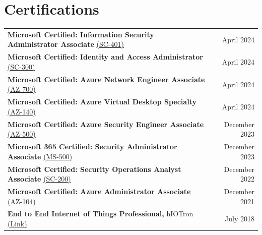 \documentclass[11pt, letterpaper]{article}
\begin{document}
\section{Certifications}
\begin{itemize}[leftmargin=0.15in, label={}]
    \small{\item{
    \begin{tabular*}{0.97\textwidth}{l@{\extracolsep{\fill}}r}
      \textbf{\color{darktext}Microsoft Certified: Information Security Administrator Associate} \href{https://learn.microsoft.com/api/credentials/share/en-in/ChinmayDhokMAQSoftware-5822/175A9EF2AB5B5B56?sharingId=BC2982D57159EF1A}{\color{graytext}(SC-401)} & \color{lightgray}April 2024 \\
      \textbf{\color{darktext}Microsoft Certified: Identity and Access Administrator} \href{https://learn.microsoft.com/en-us/users/chinmaydhokmaqsoftware-5822/credentials/82be0c3d23d052b8}{\color{graytext}(SC-300)} & \color{lightgray}April 2024 \\
      \textbf{\color{darktext}Microsoft Certified: Azure Network Engineer Associate} \href{https://learn.microsoft.com/en-us/users/ChinmayDhokMAQSoftware-5822/credentials/4244163FEBBEDDAF}{\color{graytext}(AZ-700)} & \color{lightgray}April 2024 \\
      \textbf{\color{darktext}Microsoft Certified: Azure Virtual Desktop Specialty} \href{https://learn.microsoft.com/en-us/users/chinmaydhokmaqsoftware-5822/credentials/ccf1857230b93a53}{\color{graytext}(AZ-140)} & \color{lightgray}April 2024 \\
      \textbf{\color{darktext}Microsoft Certified: Azure Security Engineer Associate} \href{https://learn.microsoft.com/en-us/users/ChinmayDhokMAQSoftware-5822/credentials/AB3913F87040CE9}{\color{graytext}(AZ-500)} & \color{lightgray}December 2023 \\
      \textbf{\color{darktext}Microsoft 365 Certified: Security Administrator Associate} \href{https://learn.microsoft.com/en-us/users/chinmaydhokmaqsoftware-5822/credentials/c0ae1a2902b51750}{\color{graytext}(MS-500)} & \color{lightgray}December 2023 \\
      \textbf{\color{darktext}Microsoft Certified: Security Operations Analyst Associate} \href{https://learn.microsoft.com/en-us/users/ChinmayDhokMAQSoftware-5822/credentials/E22E4108C28D9FF2}{\color{graytext}(SC-200)} & \color{lightgray}December 2022 \\
      \textbf{\color{darktext}Microsoft Certified: Azure Administrator Associate} \href{https://learn.microsoft.com/en-us/users/chinmaydhokmaqsoftware-5822/credentials/ccf1857230b93a53}{\color{graytext}(AZ-104)} & \color{lightgray}December 2021 \\
      \textbf{\color{darktext}End to End Internet of Things Professional,} hIOTron \href{https://drive.google.com/file/d/1TszTWmW1DkZhw1jVyjv3x0MUVGfYMrgD/view?usp=sharing}{\color{graytext}(Link)} & \color{lightgray}July 2018 \\
    \end{tabular*}
    }}
\end{itemize}
\end{document}
